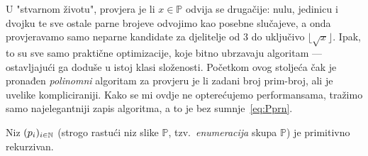 U "stvarnom životu", provjera je li $x\in\mathbb P$ odvija se drugačije: nulu, jedinicu i dvojku te sve ostale parne brojeve odvojimo kao posebne slučajeve, a onda provjeravamo samo neparne kandidate za djelitelje od 3 do uključivo $\lfloor\!\sqrt{x}\rfloor$. Ipak, to su sve samo praktične optimizacije, koje bitno ubrzavaju algoritam --- ostavljajući ga doduše u istoj klasi složenosti. Početkom ovog stoljeća čak je pronađen \emph{polinomni} algoritam za provjeru je li zadani broj prim-broj, ali je uvelike kompliciraniji. Kako se mi ovdje ne opterećujemo performansama, tražimo samo najelegantniji zapis algoritma, a to je bez sumnje~\eqref{eq:Pprn}.

\begin{propozicija}[{name=[primitivna rekurzivnost enumeracije skupa $\mathbb P$]}]\label{pp:primeprn}
    Niz $(p_i)_{i\in{\mathbb N}}$ (strogo rastući niz slike $\mathbb P$, tzv.\ \!\emph{enumeracija} skupa $\mathbb P$) je primitivno rekurzivan.
\end{propozicija}
